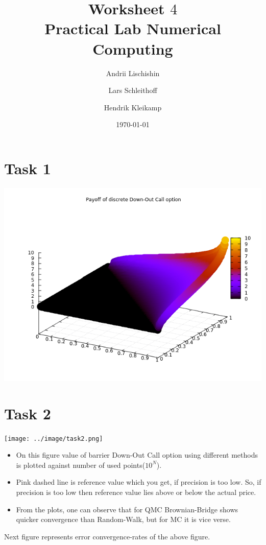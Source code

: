 \documentclass[10pt,a4paper]{article}
\begin{document}
\title{Worksheet $4$\\
\small{Practical Lab Numerical Computing}}
\author{Andrii Lischishin \and Lars Schleithoff \and Hendrik Kleikamp}
\date{\today}
\maketitle

\section*{Task 1}

\begin{center}
	\includegraphics[scale=0.7]{payoff_down_out_call.png}
\end{center}

\section*{Task 2}


\begin{center}
	\texttt{[image: ../image/task2.png]}
\end{center}

\begin{itemize}
    \item{On this figure value of barrier Down-Out Call option using different methods is plotted against number of used points($10^N$).
    }
\item{
Pink dashed line is reference value which you get, if precision is too low. So, if precision is too low then reference value lies above or below the actual price.
}
\item{
From the plots, one can observe that for QMC Brownian-Bridge shows quicker convergence than Random-Walk, but for MC it is vice verse.
}
\end{itemize}
Next figure represents error convergence-rates of the above figure.
\end{document}
